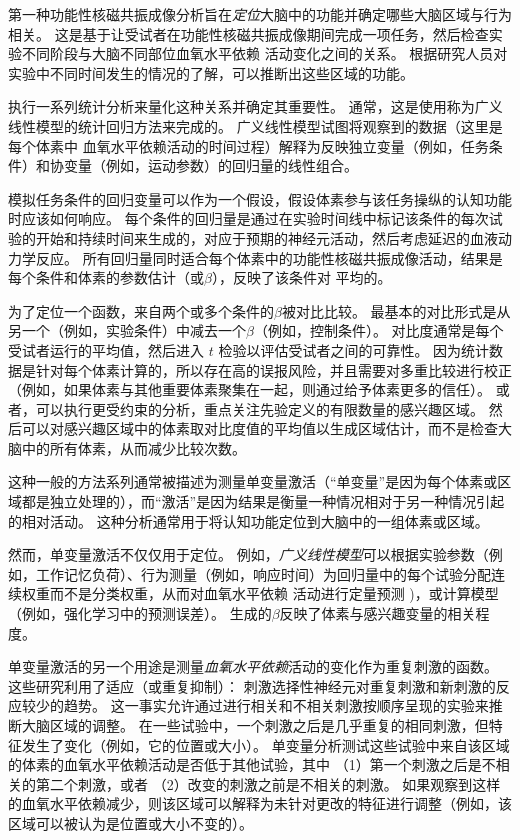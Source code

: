 第一种功能性核磁共振成像分析旨在\textit{定位}大脑中的功能并确定哪些大脑区域与行为相关。 
这是基于让受试者在功能性核磁共振成像期间完成一项任务，然后检查实验不同阶段与大脑不同部位血氧水平依赖 活动变化之间的关系。 
根据研究人员对实验中不同时间发生的情况的了解，可以推断出这些区域的功能。


执行一系列统计分析来量化这种关系并确定其重要性。 
通常，这是使用称为广义线性模型的统计回归方法来完成的。 
广义线性模型试图将观察到的数据（这里是每个体素中 血氧水平依赖活动的时间过程）解释为反映独立变量（例如，任务条件）和协变量（例如，运动参数）的回归量的线性组合。


模拟任务条件的回归变量可以作为一个假设，假设体素参与该任务操纵的认知功能时应该如何响应。
每个条件的回归量是通过在实验时间线中标记该条件的每次试验的开始和持续时间来生成的，对应于预期的神经元活动，然后考虑延迟的血液动力学反应。
所有回归量同时适合每个体素中的功能性核磁共振成像活动，结果是每个条件和体素的参数估计（或$\beta$），反映了该条件对 平均的。


为了定位一个函数，来自两个或多个条件的$\beta$被对比比较。 
最基本的对比形式是从另一个（例如，实验条件）中减去一个$\beta$（例如，控制条件）。 
对比度通常是每个受试者运行的平均值，然后进入 $t$ 检验以评估受试者之间的可靠性。 
因为统计数据是针对每个体素计算的，所以存在高的误报风险，并且需要对多重比较进行校正（例如，如果体素与其他重要体素聚集在一起，则通过给予体素更多的信任）。 
或者，可以执行更受约束的分析，重点关注先验定义的有限数量的感兴趣区域。 
然后可以对感兴趣区域中的体素取对比度值的平均值以生成区域估计，而不是检查大脑中的所有体素，从而减少比较次数。


这种一般的方法系列通常被描述为测量单变量激活（“单变量”是因为每个体素或区域都是独立处理的），而“激活”是因为结果是衡量一种情况相对于另一种情况引起的相对活动。
这种分析通常用于将认知功能定位到大脑中的一组体素或区域。


然而，单变量激活不仅仅用于定位。
例如，\textit{广义线性模型}可以根据实验参数（例如，工作记忆负荷）、行为测量（例如，响应时间）为回归量中的每个试验分配连续权重而不是分类权重，从而对血氧水平依赖 活动进行定量预测 )，或计算模型（例如，强化学习中的预测误差）。
生成的$\beta$反映了体素与感兴趣变量的相关程度。


单变量激活的另一个用途是测量\textit{血氧水平依赖}活动的变化作为重复刺激的函数。
这些研究利用了适应（或重复抑制）：
刺激选择性神经元对重复刺激和新刺激的反应较少的趋势。
这一事实允许通过进行相关和不相关刺激按顺序呈现的实验来推断大脑区域的调整。
在一些试验中，一个刺激之后是几乎重复的相同刺激，但特征发生了变化（例如，它的位置或大小）。
单变量分析测试这些试验中来自该区域的体素的血氧水平依赖活动是否低于其他试验，其中
（1）第一个刺激之后是不相关的第二个刺激，或者
（2）改变的刺激之前是不相关的刺激。
如果观察到这样的血氧水平依赖减少，则该区域可以解释为未针对更改的特征进行调整（例如，该区域可以被认为是位置或大小不变的）。


